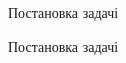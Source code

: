 \begin{frame}{Постановка задачі}
	\manimate
\end{frame}

\begin{frame}{Постановка задачі}
	\manimate
\end{frame}